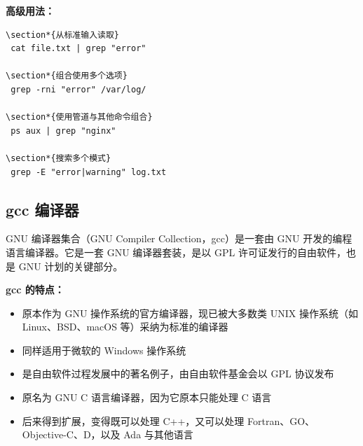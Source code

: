 \documentclass[12pt,UTF8]{ctexbook}
\begin{document}
\textbf{高级用法：}
\begin{verbatim}
\section*{从标准输入读取}
 cat file.txt | grep "error"

\section*{组合使用多个选项}
 grep -rni "error" /var/log/

\section*{使用管道与其他命令组合}
 ps aux | grep "nginx"

\section*{搜索多个模式}
 grep -E "error|warning" log.txt
\end{verbatim}

\subsection{gcc 编译器}
GNU 编译器集合（GNU Compiler Collection，gcc）是一套由 GNU 开发的编程语言编译器。它是一套 GNU 编译器套装，是以 GPL 许可证发行的自由软件，也是 GNU 计划的关键部分。

\textbf{gcc 的特点：}
\begin{itemize}
    \item 原本作为 GNU 操作系统的官方编译器，现已被大多数类 UNIX 操作系统（如 Linux、BSD、macOS 等）采纳为标准的编译器
    \item 同样适用于微软的 Windows 操作系统
    \item 是自由软件过程发展中的著名例子，由自由软件基金会以 GPL 协议发布
    \item 原名为 GNU C 语言编译器，因为它原本只能处理 C 语言
    \item 后来得到扩展，变得既可以处理 C++，又可以处理 Fortran、GO、Objective-C、D，以及 Ada 与其他语言
\end{itemize}
\end{document}
